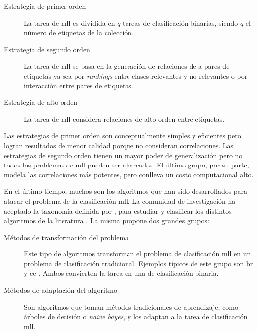 \begin{description}
	\label{estrategias_mll}

	\item[Estrategia de primer orden] La tarea de \acrshort{mll} es dividida en
	      $q$ tareas de clasificación binarias, siendo $q$ el número de etiquetas de
	      la colección.

	\item[Estrategia de segundo orden] La tarea de \acrshort{mll} se basa en la
	      generación de relaciones de a pares de etiquetas ya sea por
	      \textit{rankings} entre clases relevantes y no relevantes o por
	      interacción entre pares de etiquetas.

	\item[Estrategia de alto orden] La tarea de \acrshort{mll} considera
	      relaciones de alto orden entre etiquetas.

\end{description}

Las estrategias de primer orden son conceptualmente simples y eficientes pero
logran resultados de menor calidad porque no consideran correlaciones. Las
estrategias de segundo orden tienen un mayor poder de generalización pero no
todos los problemas de \acrshort{mll} pueden ser abarcados. El último grupo, por
su parte, modela las correlaciones más potentes, pero conlleva un costo
computacional alto.

En el último tiempo, muchos son los algoritmos que han sido desarrollados para
atacar el problema de la clasificación \acrshort{mll}. La comunidad de
investigación ha aceptado la taxonomía definida por
\citeauthor{tsoumakas_multi-label_2007}, para estudiar y clasificar los
distintos algoritmos de la literatura \cite {gibaja_tutorial_2015}. La misma
propone dos grandes grupos:

\begin{description}

	\item[Métodos de transformación del problema] Este tipo de algoritmos
	      transforman el problema de clasificación \acrshort{mll} en un problema de
	      clasificación tradicional. Ejemplos típicos de este grupo son \acrfull{br}
	      \cite{tsoumakas_multi-label_2007} y \acrfull{cc}
	      \cite{read_classifier_2011}. Ambos convierten la tarea en una de
	      clasificación binaria.

	\item[Métodos de adaptación del algoritmo] Son algoritmos que toman métodos
	      tradicionales de aprendizaje, como árboles de decisión o \textit{naive
		      bayes}, y los adaptan a la tarea de clasificación \acrshort{mll}.

\end{description}

